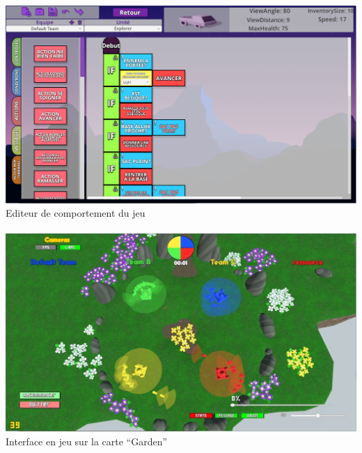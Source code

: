 \documentclass{report}
\begin{document}
\paragraph{}

\paragraph{}
\begin{adjustwidth}{-3em}{}
\includegraphics[scale=0.5]{DATA/editeurcomportement.png}
 {Editeur de comportement du jeu}
\end{adjustwidth}
\paragraph{}


\paragraph{}
\begin{adjustwidth}{-3em}{}
\includegraphics[scale=0.5]{DATA/enjeu.png}
 {Interface en jeu sur la carte “Garden”}
\end{adjustwidth}
\end{document}
